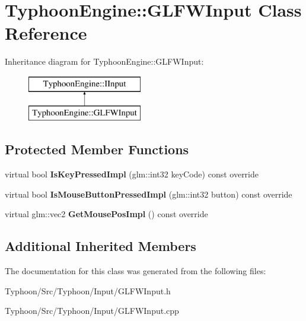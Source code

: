 \hypertarget{class_typhoon_engine_1_1_g_l_f_w_input}{}\section{Typhoon\+Engine\+::G\+L\+F\+W\+Input Class Reference}
\label{class_typhoon_engine_1_1_g_l_f_w_input}
Inheritance diagram for Typhoon\+Engine\+::G\+L\+F\+W\+Input\+:\begin{figure}[H]
\begin{center}
\leavevmode
\includegraphics[height=2.000000cm]{class_typhoon_engine_1_1_g_l_f_w_input}
\end{center}
\end{figure}
\subsection*{Protected Member Functions}
\begin{DoxyCompactItemize}
\item 
\mbox{\label{class_typhoon_engine_1_1_g_l_f_w_input_a4fe50491898700f4addeee38dee1e317}} 
virtual bool {\bfseries Is\+Key\+Pressed\+Impl} (glm\+::int32 key\+Code) const override
\item 
\mbox{\label{class_typhoon_engine_1_1_g_l_f_w_input_abc0216ec7ba4a8291652dbb8c0fa0e44}} 
virtual bool {\bfseries Is\+Mouse\+Button\+Pressed\+Impl} (glm\+::int32 button) const override
\item 
\mbox{\label{class_typhoon_engine_1_1_g_l_f_w_input_acadd284efa27bfa6ac5217fed00e910f}} 
virtual glm\+::vec2 {\bfseries Get\+Mouse\+Pos\+Impl} () const override
\end{DoxyCompactItemize}
\subsection*{Additional Inherited Members}


The documentation for this class was generated from the following files\+:\begin{DoxyCompactItemize}
\item 
Typhoon/\+Src/\+Typhoon/\+Input/G\+L\+F\+W\+Input.\+h\item 
Typhoon/\+Src/\+Typhoon/\+Input/G\+L\+F\+W\+Input.\+cpp\end{DoxyCompactItemize}
